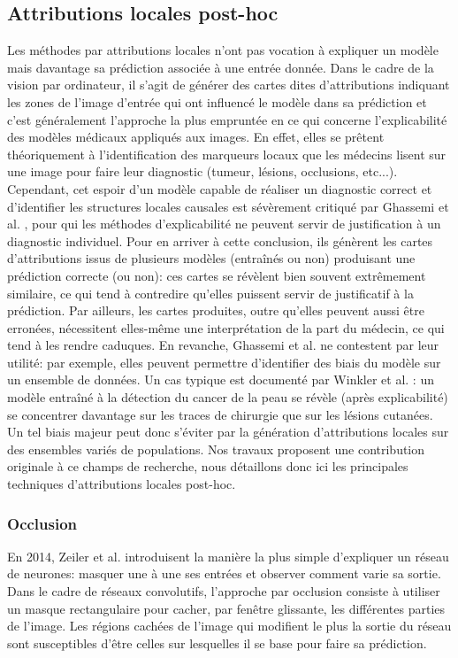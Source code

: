 \subsection{Attributions locales post-hoc}
Les méthodes par attributions locales n'ont pas vocation à expliquer un modèle mais davantage sa prédiction associée à une entrée donnée. Dans le cadre de la vision par ordinateur, il s'agit de générer des cartes dites d'attributions indiquant les zones de l'image d'entrée qui ont influencé le modèle dans sa prédiction et c'est généralement l'approche la plus empruntée en ce qui concerne l'explicabilité des modèles médicaux appliqués aux images. En effet, elles se prêtent théoriquement à l'identification des marqueurs locaux que les médecins lisent sur une image pour faire leur diagnostic (tumeur, lésions, occlusions, etc...). Cependant, cet espoir d'un modèle capable de réaliser un diagnostic correct et d'identifier les structures locales causales est sévèrement critiqué par Ghassemi et al. \cite{ghassemiFalseHopeCurrent2021}, pour qui les méthodes d'explicabilité ne peuvent servir de justification à un diagnostic individuel. Pour en arriver à cette conclusion, ils génèrent les cartes d'attributions issus de plusieurs modèles  (entraînés ou non) produisant une prédiction correcte (ou non): ces cartes se révèlent bien souvent extrêmement similaire, ce qui tend à contredire qu'elles puissent servir de justificatif à la prédiction. Par ailleurs, les cartes produites, outre qu'elles peuvent aussi être erronées, nécessitent elles-même une interprétation de la part du médecin, ce qui tend à les rendre caduques. En revanche, Ghassemi et al. ne contestent par leur utilité: par exemple, elles peuvent permettre d'identifier des biais du modèle sur un ensemble de données. Un cas typique est documenté par Winkler et al. \cite{winklerAssociationSurgicalSkin2019}: un modèle entraîné à la détection du cancer de la peau se révèle (après explicabilité) se concentrer davantage sur les traces de chirurgie que sur les lésions cutanées. Un tel biais majeur peut donc s'éviter par la génération d'attributions locales sur des ensembles variés de populations. Nos travaux proposent une contribution originale à ce champs de recherche, nous détaillons donc ici les principales techniques d'attributions locales post-hoc.


\subsubsection{Occlusion}
En 2014, Zeiler et al. \cite{zeilerVisualizingUnderstandingConvolutional2014a} introduisent la manière la plus simple d'expliquer un réseau de neurones: masquer une à une ses entrées et observer comment varie sa sortie. Dans le cadre de réseaux convolutifs, l'approche par occlusion consiste à utiliser un masque rectangulaire pour cacher, par fenêtre glissante, les différentes parties de l'image. Les régions cachées de l'image qui modifient le plus la sortie du réseau sont susceptibles d'être celles sur lesquelles il se base pour faire sa prédiction.

